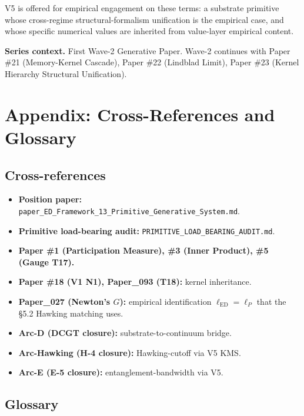 \documentclass[11pt,a4paper]{article}
\begin{document}
V5 is offered for empirical engagement on these terms: a substrate primitive whose cross-regime structural-formalism unification is the empirical case, and whose specific numerical values are inherited from value-layer empirical content.

\textbf{Series context.} First Wave-2 Generative Paper. Wave-2 continues with Paper \#21 (Memory-Kernel Cascade), Paper \#22 (Lindblad Limit), Paper \#23 (Kernel Hierarchy Structural Unification).

\section*{Appendix: Cross-References and Glossary}

\subsection*{Cross-references}

\begin{itemize}[noitemsep]
\item \textbf{Position paper:} \texttt{paper\_ED\_Framework\_13\_Primitive\_Generative\_System.md}.
\item \textbf{Primitive load-bearing audit:} \texttt{PRIMITIVE\_LOAD\_BEARING\_AUDIT.md}.
\item \textbf{Paper \#1 (Participation Measure), \#3 (Inner Product), \#5 (Gauge T17).}
\item \textbf{Paper \#18 (V1 N1), Paper\_093 (T18):} kernel inheritance.
\item \textbf{Paper\_027 (Newton's $G$):} empirical identification $\ell_\mathrm{ED} = \ell_P$ that the \S5.2 Hawking matching uses.
\item \textbf{Arc-D (DCGT closure):} substrate-to-continuum bridge.
\item \textbf{Arc-Hawking (H-4 closure):} Hawking-cutoff via V5 KMS.
\item \textbf{Arc-E (E-5 closure):} entanglement-bandwidth via V5.
\end{itemize}

\subsection*{Glossary}
\end{document}
